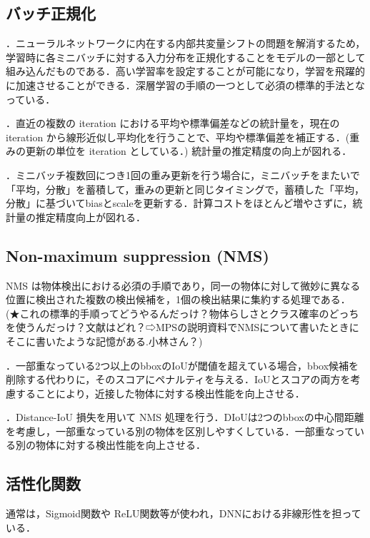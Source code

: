 \documentclass[originalpaper,fleqn]{jsaiart}     %
\begin{document}
\subsection{バッチ正規化}
 \cite{IoffeSzege15}．ニューラルネットワークに内在する内部共変量シフトの問題を解消するため，学習時に各ミニバッチに対する入力分布を正規化することをモデルの一部として組み込んだものである．高い学習率を設定することが可能になり，学習を飛躍的に加速させることができる．深層学習の手順の一つとして必須の標準的手法となっている．

 \cite{YCZHL20}．直近の複数の iteration における平均や標準偏差などの統計量を，現在の iteration から線形近似し平均化を行うことで、平均や標準偏差を補正する．(重みの更新の単位を iteration としている．) 統計量の推定精度の向上が図れる．

 \cite{BWL20}．ミニバッチ複数回につき1回の重み更新を行う場合に，ミニバッチをまたいで「平均，分散」を蓄積して，重みの更新と同じタイミングで，蓄積した「平均，分散」に基づいてbiasとscaleを更新する．計算コストをほとんど増やさずに，統計量の推定精度向上が図れる．

\subsection{Non-maximum suppression (NMS)}
NMS は物体検出における必須の手順であり，同一の物体に対して微妙に異なる位置に検出された複数の検出候補を，1個の検出結果に集約する処理である．
(★これの標準的手順ってどうやるんだっけ？物体らしさとクラス確率のどっちを使うんだっけ？文献はどれ？⇨MPSの説明資料でNMSについて書いたときにそこに書いたような記憶がある.小林さん？)

 \cite{BSCD17}．一部重なっている2つ以上のbboxのIoUが閾値を超えている場合，bbox候補を削除する代わりに，そのスコアにペナルティを与える．IoUとスコアの両方を考慮することにより，近接した物体に対する検出性能を向上させる．

 \cite{ZWLLYR20}．Distance-IoU 損失を用いて NMS 処理を行う．DIoUは2つのbboxの中心間距離を考慮し，一部重なっている別の物体を区別しやすくしている．一部重なっている別の物体に対する検出性能を向上させる．

\subsection{活性化関数}
通常は，Sigmoid関数\cite{RHW86}や ReLU関数\cite{NaiHin10}等が使われ，DNNにおける非線形性を担っている．
\end{document}
